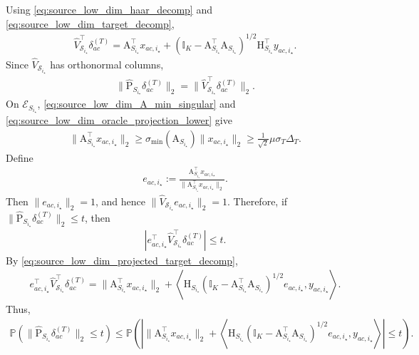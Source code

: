 \documentclass[10pt]{article}
\newcommand{\Id}{\mathbb I}
\newcommand{\wh}{\widehat}
\newcommand{\trg}{T}
\newcommand{\sigmaT}{\sigma_{\trg}}
\newcommand{\DeltaT}{\Delta_{\trg}}
\newcommand{\calS}{\mathcal S}
\newcommand{\src}{S}
\begin{document}
Using \eqref{eq:source_low_dim_haar_decomp} and \eqref{eq:source_low_dim_target_decomp},
\begin{align}
\label{eq:source_low_dim_projected_target_decomp}
    \wh V_{\calS_{i_\star}}^\top\delta_{ac}^{(\trg)}=\mathrm A_{\src_{i_\star}}^\top x_{ac,i_\star}+\left(\Id_K-\mathrm A_{\src_{i_\star}}^\top\mathrm A_{\src_{i_\star}}\right)^{1/2}\mathrm H_{\src_{i_\star}}^\top y_{ac,i_\star}.
\end{align}
Since $\wh V_{\calS_{i_\star}}$ has orthonormal columns,
\begin{align}
    \|\widehat{\mathrm P}_{\src_{i_\star}}\delta_{ac}^{(\trg)}\|_2=\|\wh V_{\calS_{i_\star}}^\top\delta_{ac}^{(\trg)}\|_2.
\end{align}
On $\mathcal E_{\src_{i_\star}}$, \eqref{eq:source_low_dim_A_min_singular} and \eqref{eq:source_low_dim_oracle_projection_lower} give
\begin{align}
\label{eq:source_low_dim_deterministic_component_lower}
    \|\mathrm A_{\src_{i_\star}}^\top x_{ac,i_\star}\|_2\ge \sigma_{\min}(\mathrm A_{\src_{i_\star}})\|x_{ac,i_\star}\|_2\ge \frac{1}{\sqrt2}\mu\sigmaT\DeltaT.
\end{align}
Define
\begin{align}
    e_{ac,i_\star}:=\frac{\mathrm A_{\src_{i_\star}}^\top x_{ac,i_\star}}{\|\mathrm A_{\src_{i_\star}}^\top x_{ac,i_\star}\|_2}.
\end{align}
Then $\|e_{ac,i_\star}\|_2=1$, and hence $\|\wh V_{\calS_{i_\star}}e_{ac,i_\star}\|_2=1$. Therefore, if $\|\widehat{\mathrm P}_{\src_{i_\star}}\delta_{ac}^{(\trg)}\|_2\le t$, then
\begin{align}
    \left|e_{ac,i_\star}^\top\wh V_{\calS_{i_\star}}^\top\delta_{ac}^{(\trg)}\right|\le t.
\end{align}
By \eqref{eq:source_low_dim_projected_target_decomp},
\begin{align}
\label{eq:source_low_dim_scalar_projection_decomp}
    e_{ac,i_\star}^\top\wh V_{\calS_{i_\star}}^\top\delta_{ac}^{(\trg)}=\|\mathrm A_{\src_{i_\star}}^\top x_{ac,i_\star}\|_2+\left\langle \mathrm H_{\src_{i_\star}}\left(\Id_K-\mathrm A_{\src_{i_\star}}^\top\mathrm A_{\src_{i_\star}}\right)^{1/2}e_{ac,i_\star},y_{ac,i_\star}\right\rangle.
\end{align}
Thus,
\begin{align}
\label{eq:source_low_dim_projection_small_ball_reduction}
    \mathbb P\left(\|\widehat{\mathrm P}_{\src_{i_\star}}\delta_{ac}^{(\trg)}\|_2\le t\right)\le \mathbb P\left(\left|\|\mathrm A_{\src_{i_\star}}^\top x_{ac,i_\star}\|_2+\left\langle \mathrm H_{\src_{i_\star}}\left(\Id_K-\mathrm A_{\src_{i_\star}}^\top\mathrm A_{\src_{i_\star}}\right)^{1/2}e_{ac,i_\star},y_{ac,i_\star}\right\rangle\right|\le t\right).
\end{align}
\end{document}
